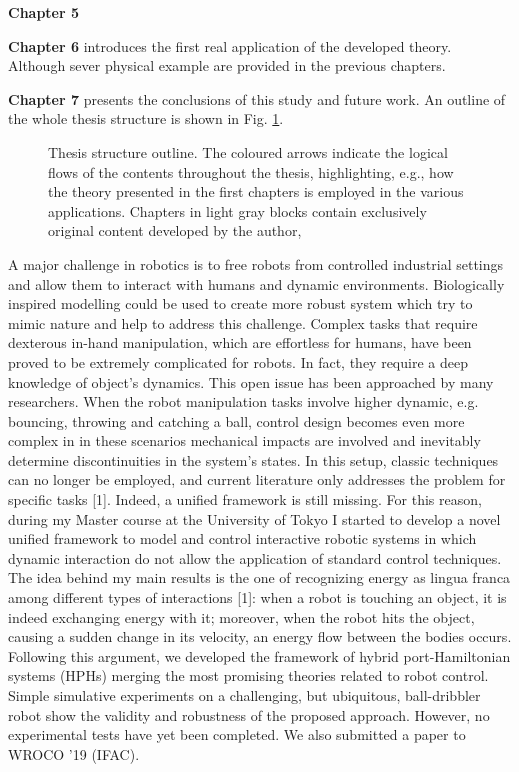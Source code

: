%
\textbf{Chapter 5}  %
\newline

%
\textbf{Chapter 6} introduces the first real application of the developed theory. Although sever physical example are provided in the previous chapters. %
\newline

%
\textbf{Chapter 7} presents the conclusions of this study and future work. An outline of the whole thesis structure is shown in Fig. \ref{fig:ThesisStructure}.

\begin{figure}[b]
    \centering
    
    \vspace{5mm}
    \caption{Thesis structure outline. The coloured arrows indicate the logical flows of the contents throughout the thesis, highlighting, e.g., how the theory presented in the first chapters is employed in the various applications. Chapters in light gray blocks contain exclusively original content developed by the author,}
    \label{fig:ThesisStructure}
\end{figure}
\clearpage
\iffalse
A major challenge in robotics is to free robots from controlled industrial settings and allow them to interact with humans and dynamic environments. Biologically inspired modelling could be used to create more robust system which try to mimic nature and help to address this challenge. Complex tasks that require dexterous in-hand manipulation, which are effortless for humans, have been proved to be extremely complicated for robots. In fact, they require a deep knowledge of object’s dynamics. This open issue has been approached by many researchers. When the robot manipulation tasks involve higher dynamic, e.g. bouncing, throwing and catching a ball, control design becomes even more complex in in these scenarios mechanical impacts are involved and inevitably determine discontinuities in the system’s states. In this setup, classic techniques can no longer be employed, and current literature only addresses the problem for specific tasks [1]. Indeed, a unified framework is still missing. For this reason, during my Master course at the University of Tokyo I started to develop a novel unified framework to model and control interactive robotic systems in which dynamic interaction do not allow the application of standard control techniques. The idea behind my main results is the one of recognizing energy as lingua franca among different types of interactions [1]: when a robot is touching an object, it is indeed exchanging energy with it; moreover, when the robot hits the object, causing a sudden change in its velocity, an energy flow between the bodies occurs. Following this argument, we developed the framework of hybrid port-Hamiltonian systems (HPHs) merging the most promising theories related to robot control. Simple simulative experiments on a challenging, but ubiquitous, ball-dribbler robot show the validity and robustness of the proposed approach. However, no experimental tests have yet been completed. We also submitted a paper to WROCO ’19 (IFAC).
